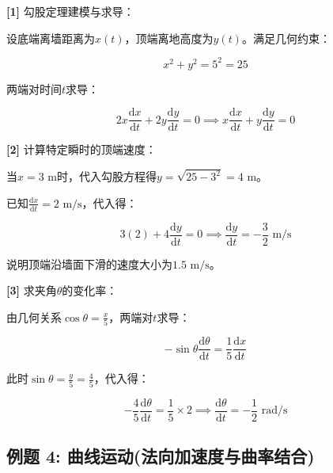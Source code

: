 \documentclass[11pt,a4paper,UTF8]{ctexart}
\begin{document}
\begin{solbox}[分步推导与答题规范]
\textbf{[1]} 勾股定理建模与求导：

设底端离墙距离为$x(t)$，顶端离地高度为$y(t)$。满足几何约束：


\begin{equation*}
x^2 + y^2 = 5^2 = 25
\end{equation*}


两端对时间$t$求导：


\begin{equation*}
2x\frac{\mathrm{d}x}{\mathrm{d}t} + 2y\frac{\mathrm{d}y}{\mathrm{d}t} = 0 \implies x\frac{\mathrm{d}x}{\mathrm{d}t} + y\frac{\mathrm{d}y}{\mathrm{d}t} = 0
\end{equation*}


\textbf{[2]} 计算特定瞬时的顶端速度：

当$x = 3\text{ m}$时，代入勾股方程得$y = \sqrt{25 - 3^2} = 4\text{ m}$。

已知$\frac{\mathrm{d}x}{\mathrm{d}t} = 2\text{ m/s}$，代入得：


\begin{equation*}
3(2) + 4\frac{\mathrm{d}y}{\mathrm{d}t} = 0 \implies \frac{\mathrm{d}y}{\mathrm{d}t} = -\frac{3}{2}\text{ m/s}
\end{equation*}


说明顶端沿墙面下滑的速度大小为$1.5\text{ m/s}$。

\textbf{[3]} 求夹角$\theta$的变化率：

由几何关系$\cos\theta = \frac{x}{5}$，两端对$t$求导：


\begin{equation*}
-\sin\theta \frac{\mathrm{d}\theta}{\mathrm{d}t} = \frac{1}{5}\frac{\mathrm{d}x}{\mathrm{d}t}
\end{equation*}


此时$\sin\theta = \frac{y}{5} = \frac{4}{5}$，代入得：


\begin{equation*}
-\frac{4}{5} \frac{\mathrm{d}\theta}{\mathrm{d}t} = \frac{1}{5} \times 2 \implies \frac{\mathrm{d}\theta}{\mathrm{d}t} = -\frac{1}{2}\text{ rad/s}
\end{equation*}

\end{solbox}


\subsection{例题 4: 曲线运动(法向加速度与曲率结合)}
\end{document}
